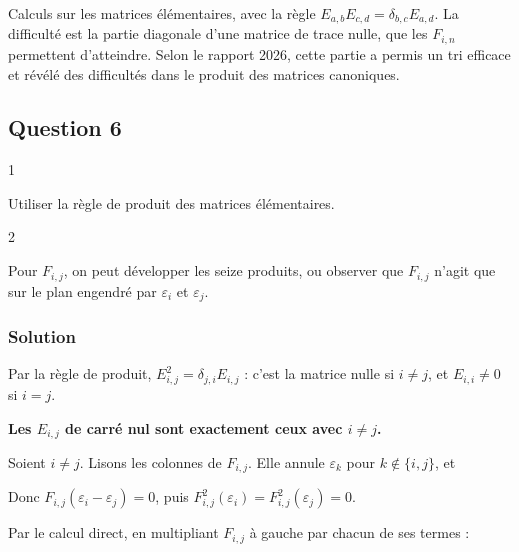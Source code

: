 \documentclass[11pt,a4paper]{article}
\newcommand{\equationajustee}[1]{%
  \sbox{\boiteequation}{$\displaystyle #1$}%
  \ifdim\wd\boiteequation>\linewidth
    \[\resizebox{\linewidth}{!}{\usebox{\boiteequation}}\]%
  \else
    \[#1\]%
  \fi}
\begin{document}
Calculs sur les matrices élémentaires, avec la règle \(E_{a,b}E_{c,d}=\delta_{b,c}E_{a,d}\). La difficulté est la partie diagonale d'une matrice de trace nulle, que les \(F_{i,n}\) permettent d'atteindre. Selon le rapport 2026, cette partie a permis un tri efficace et révélé des difficultés dans le produit des matrices canoniques.

\hypertarget{question-6}{%
\subsection{Question 6}\label{question-6}}

\begin{indication}{1}

Utiliser la règle de produit des matrices élémentaires.

\end{indication}

\begin{indication}{2}

Pour \(F_{i,j}\), on peut développer les seize produits, ou observer que \(F_{i,j}\) n'agit que sur le plan engendré par \(\varepsilon_i\) et \(\varepsilon_j\).

\end{indication}

\hypertarget{solution-5}{%
\subsubsection{Solution}\label{solution-5}}

Par la règle de produit, \(E_{i,j}^2=\delta_{j,i}E_{i,j}\) : c'est la matrice nulle si \(i\neq j\), et \(E_{i,i}\neq0\) si \(i=j\).

\textbf{Les \(E_{i,j}\) de carré nul sont exactement ceux avec \(i\neq j\).}

Soient \(i\neq j\). Lisons les colonnes de \(F_{i,j}\). Elle annule \(\varepsilon_k\) pour \(k\notin\{i,j\}\), et

\equationajustee{\begin{aligned}
F_{i,j}(\varepsilon_i)&=\varepsilon_i-\varepsilon_j,\\
F_{i,j}(\varepsilon_j)&=\varepsilon_i-\varepsilon_j.
\end{aligned}}

Donc \(F_{i,j}(\varepsilon_i-\varepsilon_j)=0\), puis \(F_{i,j}^2(\varepsilon_i)=F_{i,j}^2(\varepsilon_j)=0\).

Par le calcul direct, en multipliant \(F_{i,j}\) à gauche par chacun de ses termes :
\end{document}
